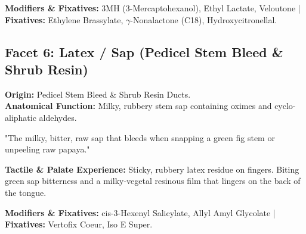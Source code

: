 \documentclass[11pt,a4paper]{article}
\begin{document}
\textbf{Modifiers \& Fixatives:} 3MH (3-Mercaptohexanol), Ethyl Lactate, Veloutone | \textbf{Fixatives:} Ethylene Brassylate, $\gamma$-Nonalactone (C18), Hydroxycitronellal.

\vspace{1.5em}

\subsection{Facet 6: Latex / Sap (Pedicel Stem Bleed \& Shrub Resin)}

\begin{botanicalbox}
\textbf{Origin:} Pedicel Stem Bleed \& Shrub Resin Ducts.\\
\textbf{Anatomical Function:} Milky, rubbery stem sap containing oximes and cyclo-aliphatic aldehydes.
\end{botanicalbox}

\begin{sensoryquote}
"The milky, bitter, raw sap that bleeds when snapping a green fig stem or unpeeling raw papaya."
\end{sensoryquote}

\begin{flavourbox}
\textbf{Tactile \& Palate Experience:} Sticky, rubbery latex residue on fingers. Biting green sap bitterness and a milky-vegetal resinous film that lingers on the back of the tongue.
\end{flavourbox}

\begin{table}[htbp]
\centering
\caption{Primary Impact Actors for Facet 6 (Latex / Sap)}
\vspace{0.3em}
\end{table}

\textbf{Modifiers \& Fixatives:} cis-3-Hexenyl Salicylate, Allyl Amyl Glycolate | \textbf{Fixatives:} Vertofix Coeur, Iso E Super.
\end{document}
